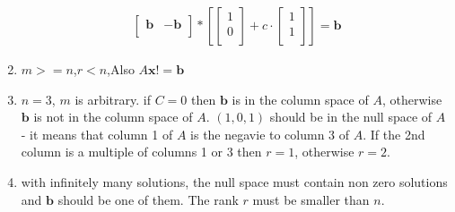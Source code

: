 \documentclass[a4paper,11pt]{article}
\newcommand{\mybf}[1]{\boldsymbol{#1}}
\begin{document}
\begin{enumerate}
\begin{align}
\begin{bmatrix}
\mybf{b} & -\mybf{b}\\
\end{bmatrix} 
*
[
\begin{bmatrix}
1 \\
0 \\
\end{bmatrix}  + 
c \cdot
\begin{bmatrix}
1 \\
1 \\
\end{bmatrix}
] =
\mybf{b}
\end{align}
\item $m>=n$,$r<n$,Also $A\mybf{x}!=\mybf{b}$
\item $n=3$, $m$ is arbitrary. if $C=0$ then $\mybf{b}$ is in the column space of $A$, otherwise $\mybf{b}$ is not in the column space of $A$. $(1,0,1)$ should be in the null space of $A$ - it means that column 1 of $A$ is the negavie to column 3 of $A$. If the 2nd column is a multiple of columns 1 or 3 then $r=1$, otherwise $r=2$.
\item with infinitely many solutions, the null space must contain non zero solutions and $\mybf{b}$ should be one of them. The rank $r$ must be smaller than $n$. 
\end{enumerate}
\end{document}
